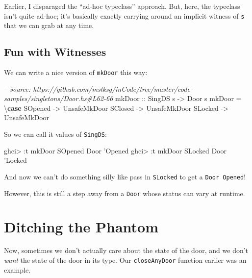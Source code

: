 \documentclass[]{article}
\newenvironment{Shaded}{}{}
\newcommand{\KeywordTok}[1]{\textcolor[rgb]{0.00,0.44,0.13}{\textbf{#1}}}
\newcommand{\DataTypeTok}[1]{\textcolor[rgb]{0.56,0.13,0.00}{#1}}
\newcommand{\CharTok}[1]{\textcolor[rgb]{0.25,0.44,0.63}{#1}}
\newcommand{\CommentTok}[1]{\textcolor[rgb]{0.38,0.63,0.69}{\textit{#1}}}
\newcommand{\OtherTok}[1]{\textcolor[rgb]{0.00,0.44,0.13}{#1}}
\newcommand{\FunctionTok}[1]{\textcolor[rgb]{0.02,0.16,0.49}{#1}}
\newcommand{\NormalTok}[1]{#1}
\begin{document}
Earlier, I disparaged the ``ad-hoc typeclass'' approach. But, here, the
typeclass isn't quite ad-hoc; it's basically exactly carrying around an implicit
witness of \texttt{s} that we can grab at any time.

\subsection{Fun with Witnesses}\label{fun-with-witnesses}

We can write a nice version of \texttt{mkDoor} this way:

\begin{Shaded}
\begin{Highlighting}[]
\CommentTok{-- source: https://github.com/mstksg/inCode/tree/master/code-samples/singletons/Door.hs#L62-66}
\OtherTok{mkDoor ::} \DataTypeTok{SingDS}\NormalTok{ s }\OtherTok{->} \DataTypeTok{Door}\NormalTok{ s}
\NormalTok{mkDoor }\FunctionTok{=}\NormalTok{ \textbackslash{}}\KeywordTok{case}
    \DataTypeTok{SOpened} \OtherTok{->} \DataTypeTok{UnsafeMkDoor}
    \DataTypeTok{SClosed} \OtherTok{->} \DataTypeTok{UnsafeMkDoor}
    \DataTypeTok{SLocked} \OtherTok{->} \DataTypeTok{UnsafeMkDoor}
\end{Highlighting}
\end{Shaded}

So we can call it values of \texttt{SingDS}:

\begin{Shaded}
\begin{Highlighting}[]
\NormalTok{ghci}\FunctionTok{>} \FunctionTok{:}\NormalTok{t mkDoor }\DataTypeTok{SOpened}
\DataTypeTok{Door} \CharTok{'Opened}
\NormalTok{ghci}\FunctionTok{>} \FunctionTok{:}\NormalTok{t mkDoor }\DataTypeTok{SLocked}
\DataTypeTok{Door} \CharTok{'Locked}
\end{Highlighting}
\end{Shaded}

And now we can't do something silly like pass in \texttt{SLocked} to get a
\texttt{Door\ \textquotesingle{}Opened}!

However, this is still a step away from a \texttt{Door} whose status can vary at
runtime.

\section{Ditching the Phantom}\label{ditching-the-phantom}

Now, sometimes we don't actually care about the state of the door, and we don't
\emph{want} the state of the door in its type. Our \texttt{closeAnyDoor}
function earlier was an example.
\end{document}
